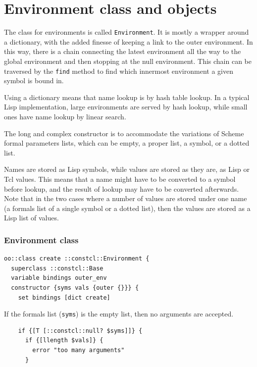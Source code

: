 \documentclass[twoside]{report}
\begin{document}
\chapter{Environment class and objects}
\label{environment-class-and-objects}

The class for environments is called \texttt{Environment}. It is mostly a wrapper around a dictionary, with the added finesse of keeping a link to the outer environment. In this way, there is a chain connecting the latest environment all the way to the global environment and then stopping at the null environment. This chain can be traversed by the \texttt{find} method to find which innermost environment a given symbol is bound in.

Using a dictionary means that name lookup is by hash table lookup. In a typical Lisp implementation, large environments are served by hash lookup, while small ones have name lookup by linear search.

The long and complex constructor is to accommodate the variations of Scheme formal parameters lists, which can be empty, a proper list, a symbol, or a dotted list.

Names are stored as Lisp symbols, while values are stored as they are, as Lisp or Tcl values. This means that a name might have to be converted to a symbol before lookup, and the result of lookup may have to be converted afterwards. Note that in the two cases where a number of values are stored under one name (a formals list of a single symbol or a dotted list), then the values are stored as a Lisp list of values.

\subsection{Environment class}
\label{environment-class}

\begin{lstlisting}
oo::class create ::constcl::Environment {
  superclass ::constcl::Base
  variable bindings outer_env
  constructor {syms vals {outer {}}} {
    set bindings [dict create]
\end{lstlisting}

If the formals list (\texttt{syms}) is the empty list, then no arguments are accepted.

\begin{lstlisting}
    if {[T [::constcl::null? $syms]]} {
      if {[llength $vals]} {
        error "too many arguments"
      }
\end{lstlisting}
\end{document}
